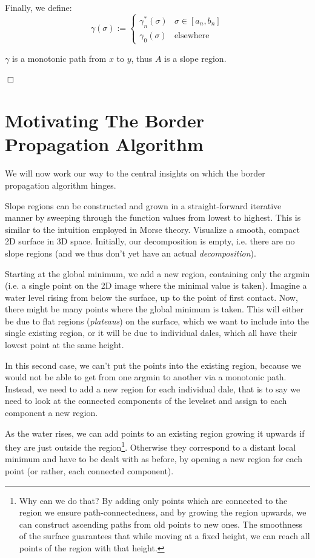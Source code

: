 \documentclass[a4paper,12pt]{paper}
\theoremstyle{plain}
\theoremstyle{definition}
\begin{document}
Finally, we define:
\begin{equation*}
\gamma(\sigma) :=
\begin{cases}
\gamma_n^*(\sigma) & \sigma \in [a_n, b_n] \\
\gamma_0(\sigma) & \text{elsewhere}
\end{cases}
\end{equation*}

$\gamma$ is a monotonic path from $x$ to $y$, thus $A$ is a slope region.

\hfill $\Box$



\section{Motivating The Border Propagation Algorithm}
We will now work our way to the central insights on which the border propagation algorithm hinges.

Slope regions can be constructed and grown in a straight-forward iterative manner by sweeping through the function values from lowest to highest. This is similar to the intuition employed in Morse theory\cite{MatsumotoYukio2002AitM}. Visualize a smooth, compact 2D surface in 3D space. Initially, our decomposition is empty, i.e. there are no slope regions (and we thus don't yet have an actual \emph{decomposition}).

Starting at the global minimum, we add a new region, containing only the argmin (i.e. a single point on the 2D image where the minimal value is taken). Imagine a water level rising from below the surface, up to the point of first contact. Now, there might be many points where the global minimum is taken. This will either be due to flat regions (\emph{plateaus}) on the surface, which we want to include into the single existing region, or it will be due to individual dales, which all have their lowest point at the same height.

In this second case, we can't put the points into the existing region, because we would not be able to get from one argmin to another via a monotonic path. Instead, we need to add a new region for each individual dale, that is to say we need to look at the connected components of the levelset and assign to each component a new region.

As the water rises, we can add points to an existing region growing it upwards if they are just outside the region\footnote{Why can we do that? By adding only points which are connected to the region we ensure path-connectedness, and by growing the region upwards, we can construct ascending paths from old points to new ones. The smoothness of the surface guarantees that while moving at a fixed height, we can reach all points of the region with that height.}. Otherwise they correspond to a distant local minimum and have to be dealt with as before, by opening a new region for each point (or rather, each connected component).
\end{document}
